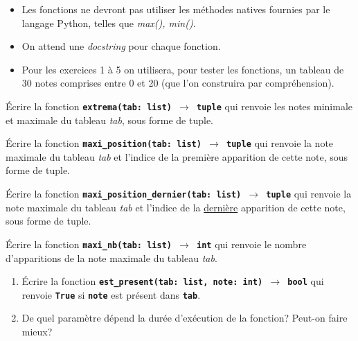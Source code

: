 \documentclass[a4paper,11pt]{article}
\begin{document}
\begin{aretenir}[Remarques]
    \begin{itemize}
        \item Les fonctions ne devront pas utiliser les méthodes natives fournies par le langage Python, telles que \emph{max(), min()}.
        \item On attend une \emph{docstring} pour chaque fonction.
        \item Pour les exercices 1 à 5 on utilisera, pour tester les fonctions, un tableau de 30 notes comprises entre 0 et 20 (que l'on construira par compréhension).
    \end{itemize}
\end{aretenir}

\begin{exo}
    Écrire la fonction \texttt{\textbf{extrema(tab: list) $\rightarrow$ tuple}} qui renvoie les notes minimale et maximale du tableau \emph{tab}, sous forme de tuple.
\end{exo}
\begin{exo}
    Écrire la fonction \texttt{\textbf{maxi\_position(tab: list) $\rightarrow$ tuple}} qui renvoie la note maximale du tableau \emph{tab} et l'indice de la première apparition de cette note, sous forme de tuple.
\end{exo}
\begin{exo}
    Écrire la fonction \texttt{\textbf{maxi\_position\_dernier(tab: list) $\rightarrow$ tuple}} qui renvoie la note maximale du tableau \emph{tab} et l'indice de la \underline{dernière} apparition de cette note, sous forme de tuple.
\end{exo}
\begin{exo}
    Écrire la fonction \texttt{\textbf{maxi\_nb(tab: list) $\rightarrow$ int}} qui renvoie le nombre d'apparitions de la note maximale du tableau \emph{tab}.
\end{exo}
\begin{exo}
    \begin{enumerate}
        \item Écrire la fonction \texttt{\textbf{est\_present(tab: list, note: int) $\rightarrow$ bool}} qui renvoie \textbf{\texttt{True}} si \textbf{\texttt{note}} est présent dans \textbf{\texttt{tab}}.
        \item De quel paramètre dépend la durée d'exécution de la fonction? Peut-on faire mieux?
    \end{enumerate}
\end{exo}
\end{document}
